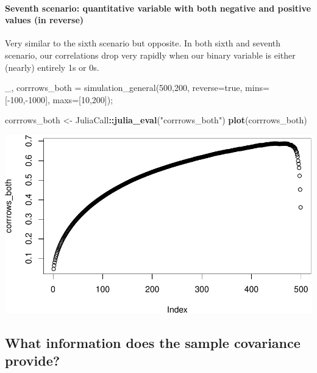 \documentclass[]{article}
\newenvironment{Shaded}{\begin{snugshade}}{\end{snugshade}}
\newcommand{\FloatTok}[1]{\textcolor[rgb]{0.00,0.00,0.81}{#1}}
\newcommand{\KeywordTok}[1]{\textcolor[rgb]{0.13,0.29,0.53}{\textbf{#1}}}
\newcommand{\NormalTok}[1]{#1}
\newcommand{\OperatorTok}[1]{\textcolor[rgb]{0.81,0.36,0.00}{\textbf{#1}}}
\newcommand{\StringTok}[1]{\textcolor[rgb]{0.31,0.60,0.02}{#1}}
\let\oldparagraph\paragraph
\renewcommand{\paragraph}[1]{\oldparagraph{#1}\mbox{}}
\begin{document}
\hypertarget{seventh-scenario-quantitative-variable-with-both-negative-and-positive-values-in-reverse}{%
\paragraph{Seventh scenario: quantitative variable with both negative
and positive values (in
reverse)}\label{seventh-scenario-quantitative-variable-with-both-negative-and-positive-values-in-reverse}}

Very similar to the sixth scenario but opposite. In both sixth and
seventh scenario, our correlations drop very rapidly when our binary
variable is either (nearly) entirely 1s or 0s.

\begin{Shaded}
\begin{Highlighting}[]
\NormalTok{_, corrrows_both = simulation_general(}\FloatTok{500}\NormalTok{,}\FloatTok{200}\NormalTok{, reverse=true, mins=[-}\FloatTok{100}\NormalTok{,-}\FloatTok{1000}\NormalTok{], maxs=[}\FloatTok{10}\NormalTok{,}\FloatTok{200}\NormalTok{]);}
\end{Highlighting}
\end{Shaded}

\begin{Shaded}
\begin{Highlighting}[]
\NormalTok{corrrows_both <-}\StringTok{ }\NormalTok{JuliaCall}\OperatorTok{::}\KeywordTok{julia_eval}\NormalTok{(}\StringTok{"corrrows_both"}\NormalTok{)}
\KeywordTok{plot}\NormalTok{(corrrows_both)}
\end{Highlighting}
\end{Shaded}

\includegraphics{./figures/unnamed-chunk-26-1.pdf}

\newpage

\hypertarget{what-information-does-the-sample-covariance-provide}{%
\subsection{What information does the sample covariance
provide?}\label{what-information-does-the-sample-covariance-provide}}
\end{document}
